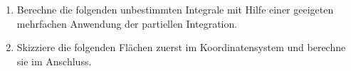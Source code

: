 	\begin{aufgabe}
		\begin{enumerate}
			\item Berechne die folgenden unbestimmten Integrale mit Hilfe einer geeigeten mehrfachen Anwendung der partiellen Integration.
			\item Skizziere die folgenden Flächen zuerst im Koordinatensystem und berechne sie im Anschluss.
		\end{enumerate}
	\end{aufgabe}

